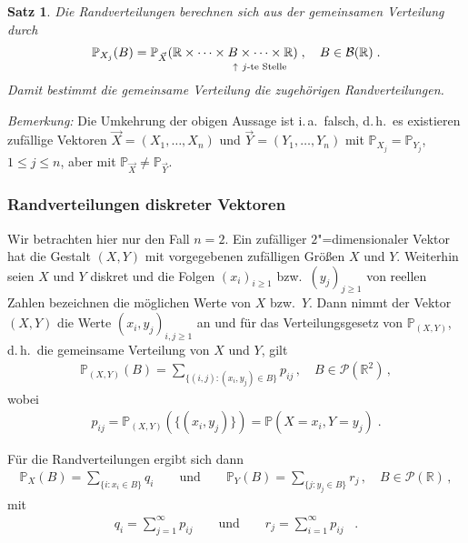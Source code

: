 \documentclass[ngerman,draft,parskip=half,twoside]{scrartcl}
\newtheorem{thm}{Satz}[section]
\newcommand*{\R}{\mathbb{R}}      %
\newcommand*{\BorelM}{\mathcal{B}}  %
\newcommand*{\PotM}{\mathcal{P}}    %
\newcommand*{\WKM}{\mathbb{P}}      %
\begin{document}
\begin{thm}
  Die Randverteilungen berechnen sich aus der gemeinsamen Verteilung durch
  \begin{gather*}
    \WKM_{X_j}(B)
       = \WKM_{\vec X}(\R\times\dotsb\times
       \underset{\rule{0pt}{2ex}\mathrlap{\uparrow~j\text{\upshape-te~Stelle}}}{B}
       \times\dotsb\times\R)\;,\quad B\in\BorelM(\R)\;.
  \end{gather*}
  Damit bestimmt die gemeinsame Verteilung die zugehörigen Randverteilungen.
\end{thm}

\textit{Bemerkung:}
Die Umkehrung der obigen Aussage ist i.\,a.~falsch, d.\,h.~es existieren
zufällige Vektoren $\vec X=(X_1,\dotsc,X_n)$ und $\vec Y=(Y_1,\dotsc, Y_n)$ mit
$\WKM_{X_j}=\WKM_{Y_j}$, $1\le j\le n$, aber mit $\WKM_{\vec X}\ne\WKM_{\vec
Y}$.

\subsubsection{Randverteilungen diskreter Vektoren}
\label{disk}

Wir betrachten hier nur den Fall $n=2$. Ein zufälliger $2$"=dimensionaler
Vektor hat die Gestalt $(X,Y)$ mit vorgegebenen zufälligen Größen $X$ und $Y$.
Weiterhin seien $X$ und $Y$ diskret und die Folgen $(x_i)_{i\ge 1}$
bzw.~$(y_j)_{j\ge 1}$ von reellen Zahlen bezeichnen die möglichen Werte von $X$
bzw.~$Y$. Dann nimmt der Vektor $(X,Y)$ die Werte $(x_i,y_j)_{i,j\ge 1}$ an und
für das Verteilungsgesetz von $\WKM_{(X,Y)}$, d.\,h.~die gemeinsame Verteilung
von $X$ und $Y$, gilt
\begin{gather*}
  \WKM_{(X,Y)}(B)
     =\sum_{\{(i,j)\colon (x_i,y_j)\in B\}} p_{ij}\,,\quad B\in\PotM(\R^2)\,,
\end{gather*}
wobei
\begin{gather*}
  p_{ij}= \WKM_{(X,Y)}(\{(x_i,y_j)\})=\WKM(X=x_i,Y=y_j)\;.
\end{gather*}

Für die Randverteilungen ergibt sich dann
\begin{gather*}
  \WKM_X(B)=\sum_{\{i\colon x_i\in B\}} q_i \qquad\mbox{und}\qquad
     \WKM_Y(B)=\sum_{\{j\colon y_j\in B\}} r_j\,,\quad B\in\PotM(\R)\,,
\end{gather*}
mit
\begin{gather*}
  q_i
     =\sum_{j=1}^\infty p_{ij}
     \qquad\mbox{und}\qquad
     r_j=\sum_{i=1}^\infty p_{ij}\;\;\;.
\end{gather*}
\end{document}
